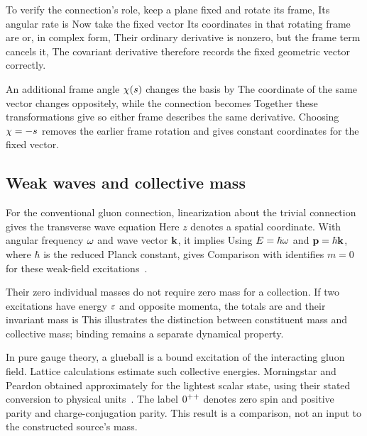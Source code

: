 To verify the connection's role, keep a plane fixed and rotate its frame,
\FieldConnectionRotatingFrameDisplay
Its angular rate is
\FieldConnectionRotatingRateDisplay
Now take the fixed vector
\FieldConnectionFixedVectorDisplay
Its coordinates in that rotating frame are
\FieldConnectionFixedCoordinatesDisplay
or, in complex form,
\FieldConnectionFixedComplexDisplay
Their ordinary derivative is nonzero, but the frame term cancels it,
\FieldConnectionCancellationDisplay
The covariant derivative therefore records the fixed geometric vector correctly.

An additional frame angle $\chi(s)$ changes the basis by
\FieldConnectionFrameChangeDisplay
The coordinate of the same vector changes oppositely,
\FieldConnectionCoordinateChangeDisplay
while the connection becomes
\FieldConnectionPotentialChangeDisplay
Together these transformations give
\FieldConnectionCovarianceDisplay
so either frame describes the same derivative. Choosing $\chi=-s$ removes the earlier frame rotation and gives constant coordinates for the fixed vector.

\subsection{Weak waves and collective mass}
For the conventional gluon connection, linearization about the trivial connection gives the transverse wave equation
\FieldYMWaveDisplay
Here $z$ denotes a spatial coordinate. With angular frequency $\omega$ and wave vector $\mathbf k$, it implies
\FieldYMDispersionDisplay
Using $E=\hbar\omega$ and $\mathbf p=\hbar\mathbf k$, where $\hbar$ is the reduced Planck constant, gives
\FieldYMMasslessEnergyDisplay
Comparison with
\FieldYMRelativisticEnergyDisplay
identifies $m=0$ for these weak-field excitations~\cite{jaffeWitten}.

Their zero individual masses do not require zero mass for a collection. If two excitations have energy $\varepsilon$ and opposite momenta,
\FieldYMOppositeMomentaDisplay
the totals are
\FieldYMCombinedEnergyDisplay
and their invariant mass is
\FieldYMPairMassDisplay
This illustrates the distinction between constituent mass and collective mass; binding remains a separate dynamical property.

In pure gauge theory, a glueball is a bound excitation of the interacting gluon field. Lattice calculations estimate such collective energies. Morningstar and Peardon obtained approximately
\FieldYMGlueballMassDisplay
for the lightest scalar state, using their stated conversion to physical units~\cite{morningstarPeardon1999}. The label $0^{++}$ denotes zero spin and positive parity and charge-conjugation parity. This result is a comparison, not an input to the constructed source's mass.

